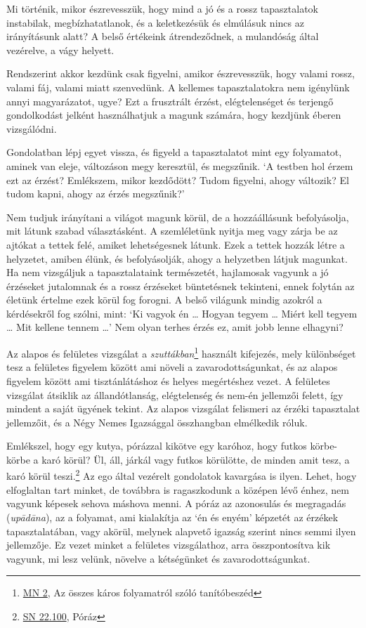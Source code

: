 Mi történik, mikor észrevesszük, hogy mind a jó és a rossz tapasztalatok
instabilak, megbízhatatlanok, és a keletkezésük és elmúlásuk nincs az
irányításunk alatt? A belső értékeink átrendeződnek, a mulandóság által
vezérelve, a vágy helyett.


Rendszerint akkor kezdünk csak figyelni, amikor észrevesszük, hogy
valami rossz, valami fáj, valami miatt szenvedünk. A kellemes
tapasztalatokra nem igénylünk annyi magyarázatot, ugye? Ezt a frusztrált
érzést, elégtelenséget és terjengő gondolkodást jelként használhatjuk a
magunk számára, hogy kezdjünk éberen vizsgálódni.

Gondolatban lépj egyet vissza, és figyeld a tapasztalatot mint egy
folyamatot, aminek van eleje, változáson megy keresztül, és megszűnik.
`A testben hol érzem ezt az érzést? Emlékszem, mikor kezdődött? Tudom
figyelni, ahogy változik? El tudom kapni, ahogy az érzés megszűnik?'

Nem tudjuk irányítani a világot magunk körül, de a hozzáállásunk
befolyásolja, mit látunk szabad választásként. A szemléletünk nyitja meg
vagy zárja be az ajtókat a tettek felé, amiket lehetségesnek látunk.
Ezek a tettek hozzák létre a helyzetet, amiben élünk, és befolyásolják,
ahogy a helyzetben látjuk magunkat. Ha nem vizsgáljuk a tapasztalataink
természetét, hajlamosak vagyunk a jó érzéseket jutalomnak és a rossz
érzéseket büntetésnek tekinteni, ennek folytán az életünk értelme ezek
körül fog forogni. A belső világunk mindig azokról a kérdésekről fog
szólni, mint: `Ki vagyok én \ldots{} Hogyan tegyem \ldots{} Miért kell
tegyem \ldots{} Mit kellene tennem \ldots{}' Nem olyan terhes érzés ez,
amit jobb lenne elhagyni?

Az alapos és felületes vizsgálat a \emph{szuttákban}\footnote{\href{https://a-buddha-ujja.hu/mn-2/hu/forizs-laszlo}{MN
  2}, Az összes káros folyamatról szóló tanítóbeszéd} használt
kifejezés, mely különbséget tesz a felületes figyelem között ami növeli
a zavarodottságunkat, és az alapos figyelem között ami tisztánlátáshoz
és helyes megértéshez vezet. A felületes vizsgálat átsiklik az
állandótlanság, elégtelenség és nem-én jellemzői felett, így mindent a
saját ügyének tekint. Az alapos vizsgálat felismeri az érzéki
tapasztalat jellemzőit, és a Négy Nemes Igazsággal összhangban
elmélkedik róluk.


Emlékszel, hogy egy kutya, pórázzal kikötve egy karóhoz, hogy futkos
körbe-körbe a karó körül? Ül, áll, járkál vagy futkos körülötte, de
minden amit tesz, a karó körül teszi.\footnote{\href{https://suttacentral.net/sn22.100}{SN
  22.100}, Póráz} Az ego által vezérelt gondolatok kavargása is ilyen.
Lehet, hogy elfoglaltan tart minket, de továbbra is ragaszkodunk a
középen lévő énhez, nem vagyunk képesek sehova máshova menni. A póráz az
azonosulás és megragadás (\emph{upādāna}), az a folyamat, ami kialakítja
az `én és enyém' képzetét az érzékek tapasztalatában, vagy akörül,
melynek alapvető igazság szerint nincs semmi ilyen jellemzője. Ez vezet
minket a felületes vizsgálathoz, arra összpontosítva kik vagyunk, mi
lesz velünk, növelve a kétségünket és zavarodottságunkat.

